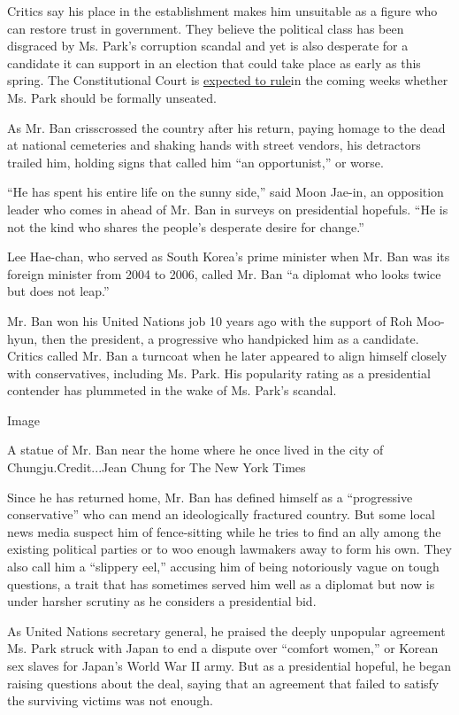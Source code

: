 Critics say his place in the establishment makes him unsuitable as a
figure who can restore trust in government. They believe the political
class has been disgraced by Ms. Park's corruption scandal and yet is
also desperate for a candidate it can support in an election that could
take place as early as this spring. The Constitutional Court is
\href{https://www.nytimes.com/2016/12/22/world/asia/south-korea-president-park-impeachment.html}{expected
to rule}in the coming weeks whether Ms. Park should be formally
unseated.

As Mr. Ban crisscrossed the country after his return, paying homage to
the dead at national cemeteries and shaking hands with street vendors,
his detractors trailed him, holding signs that called him ``an
opportunist,'' or worse.

``He has spent his entire life on the sunny side,'' said Moon Jae-in, an
opposition leader who comes in ahead of Mr. Ban in surveys on
presidential hopefuls. ``He is not the kind who shares the people's
desperate desire for change.''

Lee Hae-chan, who served as South Korea's prime minister when Mr. Ban
was its foreign minister from 2004 to 2006, called Mr. Ban ``a diplomat
who looks twice but does not leap.''

Mr. Ban won his United Nations job 10 years ago with the support of Roh
Moo-hyun, then the president, a progressive who handpicked him as a
candidate. Critics called Mr. Ban a turncoat when he later appeared to
align himself closely with conservatives, including Ms. Park. His
popularity rating as a presidential contender has plummeted in the wake
of Ms. Park's scandal.

Image

A statue of Mr. Ban near the home where he once lived in the city of
Chungju.Credit...Jean Chung for The New York Times

Since he has returned home, Mr. Ban has defined himself as a
``progressive conservative'' who can mend an ideologically fractured
country. But some local news media suspect him of fence-sitting while he
tries to find an ally among the existing political parties or to woo
enough lawmakers away to form his own. They also call him a ``slippery
eel,'' accusing him of being notoriously vague on tough questions, a
trait that has sometimes served him well as a diplomat but now is under
harsher scrutiny as he considers a presidential bid.

As United Nations secretary general, he praised the deeply unpopular
agreement Ms. Park struck with Japan to end a dispute over ``comfort
women,'' or Korean sex slaves for Japan's World War II army. But as a
presidential hopeful, he began raising questions about the deal, saying
that an agreement that failed to satisfy the surviving victims was not
enough.

